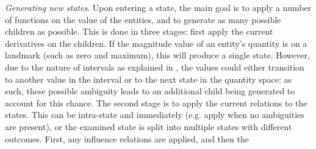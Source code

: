 \textit{Generating new states}. Upon entering a state, the main goal is to apply
a number of functions on the value of the entities, and to generate as many
possible children as possible. This is done in three stages: first apply the
current derivatives on the children. If the magnitude value of an entity's
quantity is on a landmark (such as zero and maximum), this will produce a single
state. However, due to the nature of intervals as explained in
\cite{Bredeweg06garp3-}, the values could either transition to another value in
the interval or to the next state in the quantity space: as such, these possible
ambiguity leads to an additional child being generated to account for this
chance. The second stage is to apply the current relations to the states. This
can be intra-state and immediately (e.g. apply when no ambiguities are present),
or the examined state is split into multiple states with different outcomes.
First, any influence relations are applied, and then the 
